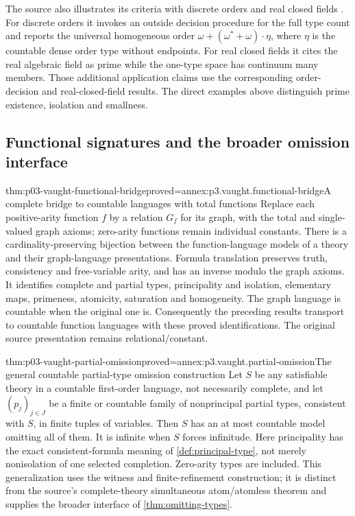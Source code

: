 The source also illustrates its criteria with discrete orders and
real closed fields \cite[p.~315]{Vaught1961}.
For discrete orders it invokes an outside decision procedure for
the full type count and reports the universal homogeneous order
\(\omega+(\omega^*+\omega)\cdot\eta\), where \(\eta\) is the
countable dense order type without endpoints.
For real closed fields it cites the real algebraic field as prime
while the one-type space has continuum many members.
Those additional application claims use the corresponding
order-decision and real-closed-field results. The direct examples
above distinguish prime existence, isolation and smallness.

\subsection{Functional signatures and the broader omission interface}
\label{sec:p03-vaught-language-bridge}

\begin{hblemma}{thm:p03-vaught-functional-bridge}{proved=annex:p3.vaught.functional-bridge}{A complete bridge to countable languages with total functions}
Replace each positive-arity function \(f\) by a relation \(G_f\)
for its graph, with the total and single-valued graph axioms;
zero-arity functions remain individual constants.
There is a cardinality-preserving bijection between the function-language
models of a theory and their graph-language presentations.
Formula translation preserves truth, consistency and free-variable arity,
and has an inverse modulo the graph axioms.
It identifies complete and partial types, principality and isolation,
elementary maps, primeness, atomicity, saturation and homogeneity.
The graph language is countable when the original one is.
Consequently the preceding results transport to countable
function languages with these proved identifications.
The original source presentation remains relational/constant.
\end{hblemma}

\begin{hbtheorem}{thm:p03-vaught-partial-omission}{proved=annex:p3.vaught.partial-omission}{The general countable partial-type omission construction}
Let \(S\) be any satisfiable theory in a countable first-order language,
not necessarily complete, and let \((p_j)_{j\in J}\) be a finite or
countable family of nonprincipal partial types, consistent with \(S\),
in finite tuples of variables.
Then \(S\) has an at most countable model omitting all of them.
It is infinite when \(S\) forces infinitude.
Here principality has the exact consistent-formula meaning of
\cref{def:principal-type}, not merely nonisolation of one selected completion.
Zero-arity types are included.
This generalization uses the witness and finite-refinement construction;
it is distinct from the source's complete-theory simultaneous atom/atomless
theorem and supplies the broader interface of \cref{thm:omitting-types}.
\end{hbtheorem}

